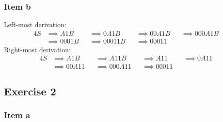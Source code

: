 {\subsubsection{Item b}
\begin{minipage}[b]{0.6\textwidth}
	Left-most derivation:
	\begin{alignat*}{4}
		S &\implies A1B   &&\implies 0A1B   &&\implies 00A1B &&\implies 000A1B \\
		  &\implies 0001B &&\implies 00011B &&\implies 00011 &&
	\end{alignat*}
	Right-most derivation:
	\begin{alignat*}{4}
		S &\implies A1B   &&\implies A11B   &&\implies A11   &&\implies 0A11 \\
		  &\implies 00A11 &&\implies 000A11 &&\implies 00011 &&
	\end{alignat*}
\end{minipage}
\begin{minipage}[c]{0.3\textwidth}
	\begin{center}
	\end{center}
\end{minipage}
\pagebreak
\subsection{Exercise 2}
\begin{minipage}[c]{0.4\textwidth}
\subsubsection{Item a}
\begin{center}
\end{center}
\end{minipage}%
\begin{minipage}[c]{0.6\textwidth}

\end{minipage}}

